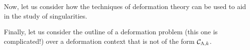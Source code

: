         Now, let us consider how the techniques of deformation theory can be used to aid in the study of singularities. 
        \begin{example}
            
        \end{example}

        Finally, let us consider the outline of a deformation problem (this one is complicated!) over a deformation context that is not of the form $\mathcal{C}_{\Lambda, k}$.
        \begin{example}
            
        \end{example}